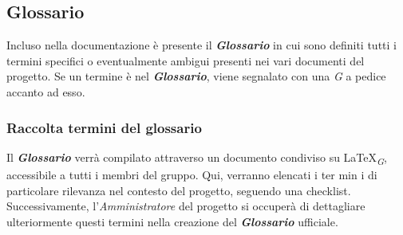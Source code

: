 \subsection{Glossario}
Incluso nella documentazione è presente il \textbf{\textit{Glossario}} in cui sono definiti tutti i termini specifici o eventualmente ambigui presenti nei vari documenti del progetto. Se un termine è nel \textbf{\textit{Glossario}}, viene segnalato con una \textit{G} a pedice accanto ad esso.

\subsubsection{Raccolta termini del glossario}
Il \textbf{\textit{Glossario}} verrà compilato attraverso un documento condiviso su \LaTeX \textsubscript{\textit{G}}, accessibile a tutti i membri del gruppo. Qui, verranno elencati i ter min i di particolare rilevanza nel contesto del progetto, seguendo una checklist.   Successivamente, l'\textit{Amministratore} del progetto si occuperà di dettagliare  ulteriormente questi termini nella creazione del \textbf{\textit{Glossario}} ufficiale. 